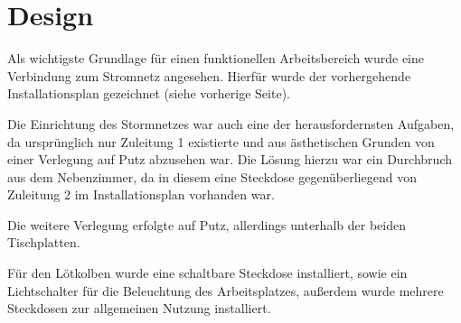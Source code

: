 
\section{Design}

Als wichtigste Grundlage für einen funktionellen Arbeitsbereich wurde eine Verbindung zum Stromnetz angesehen.
Hierfür wurde der vorhergehende Installationsplan gezeichnet (siehe vorherige Seite).

Die Einrichtung des Stormnetzes war auch eine der herausfordernsten Aufgaben, 
da ursprünglich nur Zuleitung 1 existierte und aus ästhetischen Grunden von einer Verlegung auf Putz abzusehen war.
Die Lösung hierzu war ein Durchbruch aus dem Nebenzimmer, da in diesem eine Steckdose gegenüberliegend von Zuleitung 2 im Installationsplan vorhanden war.

Die weitere Verlegung erfolgte auf Putz, allerdings unterhalb der beiden Tischplatten.

 Für den Lötkolben wurde eine schaltbare Steckdose installiert, sowie ein Lichtschalter für die Beleuchtung des Arbeitsplatzes, außerdem wurde mehrere Steckdosen zur allgemeinen Nutzung installiert.
